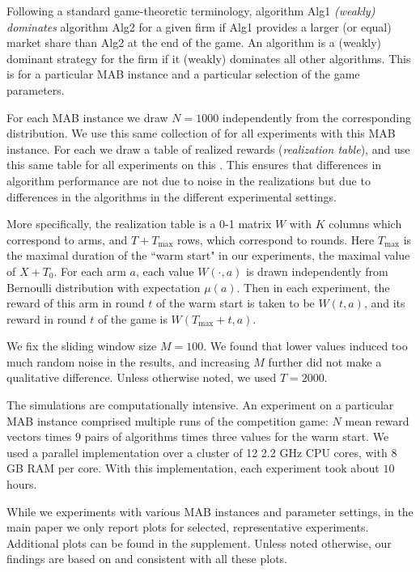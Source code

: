 \documentclass[../competing_bandits.tex]{subfiles}
\begin{document}
Following a standard game-theoretic terminology, algorithm Alg1 \emph{(weakly) dominates} algorithm Alg2 for a given firm if Alg1 provides a larger (or equal) market share than Alg2 at the end of the game. An algorithm is a (weakly) dominant strategy for the firm if it (weakly) dominates all other algorithms. This is for a particular MAB instance and a particular selection of the game parameters.



For each MAB instance we draw $N = 1000$ \MRVs independently from the corresponding distribution. We use this same collection of \MRVs for all experiments with this MAB instance. For each \MRV we draw a table of realized rewards (\emph{realization table}), and use this same table for all experiments on this \MRV. This ensures that differences in algorithm performance are not due to noise in the realizations but due to differences in the algorithms in the different experimental settings.

More specifically, the realization table is a 0-1 matrix $W$ with $K$ columns which correspond to arms, and $T+T_{\max}$ rows, which correspond to rounds. Here $T_{\max}$ is the maximal duration of the ``warm start" in our experiments, \ie the maximal value of $X+T_0$. For each arm $a$, each value $W(\cdot,a)$ is drawn independently from Bernoulli distribution with expectation $\mu(a)$. Then in each experiment, the reward of this arm in round $t$ of the warm start is taken to be $W(t,a)$, and its reward in round $t$ of the game is $W(T_{\max}+t,a)$.

We fix the sliding window size $M = 100$. We found that lower values induced too much random noise in the results, and increasing $M$ further did not make a qualitative difference. Unless otherwise noted, we used $T = 2000$.

The simulations are computationally intensive. An experiment on a particular MAB instance comprised multiple runs of the competition game: $N$ mean reward vectors times $9$ pairs of algorithms times three values for the warm start. We used a parallel implementation over a cluster of 12 2.2 GHz CPU cores, with 8 GB RAM per core. With this implementation, each experiment took about $10$ hours.

While we experiments with various MAB instances and parameter settings, in the main paper we only report plots for selected, representative experiments. Additional plots can be found in the supplement. Unless noted otherwise, our findings are based on and consistent with all these plots.
\end{document}
